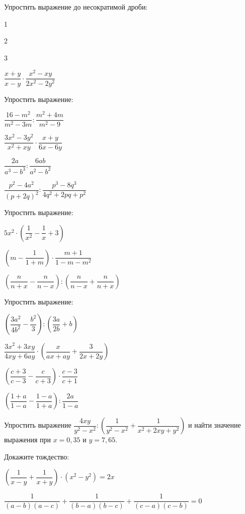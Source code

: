 \begin{listofex}
	\item Упростить выражение до несократимой дроби:
	\begin{enumcols}[itemcolumns=4]
		\item 1
		\item 2
		\item 3
		\item \( \dfrac{x+y}{x-y}\cdot\dfrac{x^2-xy}{2x^2-2y^2} \)
	\end{enumcols}
	\item Упростить выражение:
	\begin{enumcols}[itemcolumns=3]
		\item \( \dfrac{16-m^2}{m^2-3m}:\dfrac{m^2+4m}{m^2-9} \)
		\item \( \dfrac{3x^2-3y^2}{x^2+xy}\cdot\dfrac{x+y}{6x-6y} \)
		\item \( \dfrac{2a}{a^3-b^3}:\dfrac{6ab}{a^2-b^2} \)
		\item \( \dfrac{p^2-4a^2}{(p+2q)^2}:\dfrac{p^3-8q^3}{4q^2+2pq+p^2} \)
	\end{enumcols}
	\item Упростить выражение:
	\begin{enumcols}[itemcolumns=2]
		\item \( 5x^2\cdot\left( \dfrac{1}{x^2}-\dfrac{1}{x}+3 \right) \)
		\item \( \left( m-\dfrac{1}{1+m} \right)\cdot\dfrac{m+1}{1-m-m^2} \)
		\item \( \left( \dfrac{n}{n+x}-\dfrac{n}{n-x} \right):\left( \dfrac{n}{n-x}+\dfrac{n}{n+x} \right) \)
	\end{enumcols}
	\item Упростить выражение:
	\begin{enumcols}[itemcolumns=2]
		\item \( \left( \dfrac{3a^2}{4b^2}-\dfrac{b^2}{3} \right):\left( \dfrac{3a}{2b}+b \right) \)
		\item \( \dfrac{3x^2+3xy}{4xy+6ay}\cdot\left( \dfrac{x}{ax+ay}+\dfrac{3}{2x+2y} \right) \)
		\item \( \left( \dfrac{c+3}{c-3}-\dfrac{c}{c+3} \right)\cdot\dfrac{c-3}{c+1} \)
		\item \( \left( \dfrac{1+a}{1-a}-\dfrac{1-a}{1+a} \right):\dfrac{2a}{1-a} \)
	\end{enumcols}
	\item Упростить выражение \( \dfrac{4xy}{y^2-x^2}:\left( \dfrac{1}{y^2-x^2}+\dfrac{1}{x^2+2xy+y^2} \right) \) и найти значение выражения при \( x=0,35 \) и \( y=7,65 \).
	\item Докажите тождество:
	\begin{enumcols}[itemcolumns=1]
		\item \( \left( \dfrac{1}{x-y}+\dfrac{1}{x+y} \right)\cdot(x^2-y^2)=2x \)
		\item \( \dfrac{1}{(a-b)(a-c)}+\dfrac{1}{(b-a)(b-c)}+\dfrac{1}{(c-a)(c-b)}=0 \)
	\end{enumcols}
\end{listofex}
